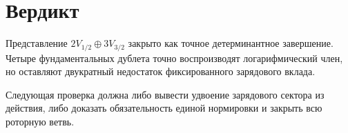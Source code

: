 \documentclass[12pt,a4paper]{article}
\begin{document}
\section{Вердикт}

Представление \(2V_{1/2}\oplus3V_{3/2}\) закрыто как точное
детерминантное завершение. Четыре фундаментальных дублета точно
воспроизводят логарифмический член, но оставляют двукратный недостаток
фиксированного зарядового вклада.

Следующая проверка должна либо вывести удвоение зарядового сектора из
действия, либо доказать обязательность единой нормировки и закрыть всю
роторную ветвь.
\end{document}
